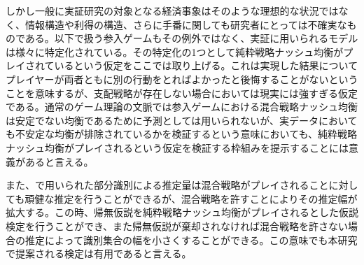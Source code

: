 しかし一般に実証研究の対象となる経済事象はそのような理想的な状況ではなく、情報構造や利得の構造、さらに手番に関しても研究者にとっては不確実なものである。以下で扱う参入ゲームもその例外ではなく、実証に用いられるモデルは様々に特定化されている。その特定化の1つとして純粋戦略ナッシュ均衡がプレイされているという仮定をここでは取り上げる。これは実現した結果についてプレイヤーが両者ともに別の行動をとればよかったと後悔することがないということを意味するが、支配戦略が存在しない場合においては現実には強すぎる仮定である。通常のゲーム理論の文脈では参入ゲームにおける混合戦略ナッシュ均衡は安定でない均衡であるために予測としては用いられないが、実データにおいても不安定な均衡が排除されているかを検証するという意味においても、純粋戦略ナッシュ均衡がプレイされるという仮定を検証する枠組みを提示することには意義があると言える。

また、\cite{Ciliberto2009a}で用いられた部分識別による推定量は混合戦略がプレイされることに対しても頑健な推定を行うことができるが、混合戦略を許すことによりその推定幅が拡大する。この時、帰無仮説を純粋戦略ナッシュ均衡がプレイされるとした仮説検定を行うことができ、また帰無仮説が棄却されなければ混合戦略を許さない場合の推定によって識別集合の幅を小さくすることができる。この意味でも本研究で提案される検定は有用であると言える。

